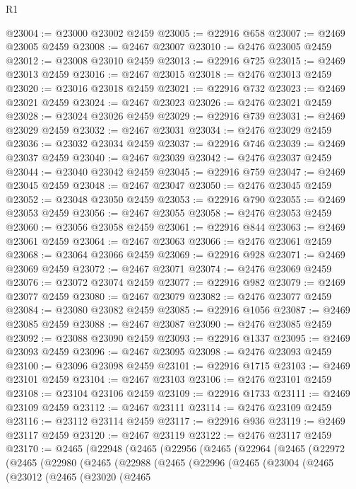 \begin{lexlean}{R1}
\begin{coremodule}
@23004 := @23000 @23002 @2459
@23005 := @22916 @658
@23007 := @2469 @23005 @2459
@23008 := @2467 @23007
@23010 := @2476 @23005 @2459
@23012 := @23008 @23010 @2459
@23013 := @22916 @725
@23015 := @2469 @23013 @2459
@23016 := @2467 @23015
@23018 := @2476 @23013 @2459
@23020 := @23016 @23018 @2459
@23021 := @22916 @732
@23023 := @2469 @23021 @2459
@23024 := @2467 @23023
@23026 := @2476 @23021 @2459
@23028 := @23024 @23026 @2459
@23029 := @22916 @739
@23031 := @2469 @23029 @2459
@23032 := @2467 @23031
@23034 := @2476 @23029 @2459
@23036 := @23032 @23034 @2459
@23037 := @22916 @746
@23039 := @2469 @23037 @2459
@23040 := @2467 @23039
@23042 := @2476 @23037 @2459
@23044 := @23040 @23042 @2459
@23045 := @22916 @759
@23047 := @2469 @23045 @2459
@23048 := @2467 @23047
@23050 := @2476 @23045 @2459
@23052 := @23048 @23050 @2459
@23053 := @22916 @790
@23055 := @2469 @23053 @2459
@23056 := @2467 @23055
@23058 := @2476 @23053 @2459
@23060 := @23056 @23058 @2459
@23061 := @22916 @844
@23063 := @2469 @23061 @2459
@23064 := @2467 @23063
@23066 := @2476 @23061 @2459
@23068 := @23064 @23066 @2459
@23069 := @22916 @928
@23071 := @2469 @23069 @2459
@23072 := @2467 @23071
@23074 := @2476 @23069 @2459
@23076 := @23072 @23074 @2459
@23077 := @22916 @982
@23079 := @2469 @23077 @2459
@23080 := @2467 @23079
@23082 := @2476 @23077 @2459
@23084 := @23080 @23082 @2459
@23085 := @22916 @1056
@23087 := @2469 @23085 @2459
@23088 := @2467 @23087
@23090 := @2476 @23085 @2459
@23092 := @23088 @23090 @2459
@23093 := @22916 @1337
@23095 := @2469 @23093 @2459
@23096 := @2467 @23095
@23098 := @2476 @23093 @2459
@23100 := @23096 @23098 @2459
@23101 := @22916 @1715
@23103 := @2469 @23101 @2459
@23104 := @2467 @23103
@23106 := @2476 @23101 @2459
@23108 := @23104 @23106 @2459
@23109 := @22916 @1733
@23111 := @2469 @23109 @2459
@23112 := @2467 @23111
@23114 := @2476 @23109 @2459
@23116 := @23112 @23114 @2459
@23117 := @22916 @936
@23119 := @2469 @23117 @2459
@23120 := @2467 @23119
@23122 := @2476 @23117 @2459
@23170 := @2465
    (@22948
      (@2465
        (@22956
          (@2465
            (@22964
              (@2465
                (@22972
                  (@2465
                    (@22980
                      (@2465
                        (@22988
                          (@2465
                            (@22996
                              (@2465
                                (@23004
                                  (@2465
                                    (@23012
                                      (@2465
                                        (@23020
                                          (@2465

\end{coremodule}
\end{lexlean}
